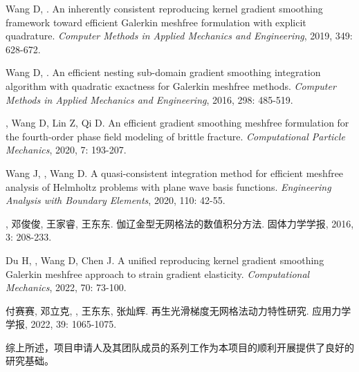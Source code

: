 \vspace{-50pt}
\begin{thebibliography}{1}
	Wang D, .
	\newblock An inherently consistent reproducing kernel gradient smoothing
	  framework toward efficient {{Galerkin}} meshfree formulation with explicit
	  quadrature.
	\newblock \emph{Computer Methods in Applied Mechanics and Engineering}, 2019,
	  349: 628-672.

	Wang D, .
	\newblock An efficient nesting sub-domain gradient smoothing integration
	  algorithm with quadratic exactness for {{Galerkin}} meshfree methods.
	\newblock \emph{Computer Methods in Applied Mechanics and Engineering}, 2016,
	  298: 485-519.

	, Wang D, Lin Z, Qi D.
	\newblock An efficient gradient smoothing meshfree formulation for the
	  fourth-order phase field modeling of brittle fracture.
	\newblock \emph{Computational Particle Mechanics}, 2020, 7: 193-207.

	Wang J, , Wang D.
	\newblock A quasi-consistent integration method for efficient meshfree analysis
	  of {{Helmholtz}} problems with plane wave basis functions.
	\newblock \emph{Engineering Analysis with Boundary Elements}, 2020, 110: 42-55.

	\textbf{}, 邓俊俊, 王家睿, 王东东.
	\newblock 伽辽金型无网格法的数值积分方法.
	\newblock 固体力学学报, 2016, 3: 208-233.

	Du H, , Wang D, Chen J.
	\newblock A unified reproducing kernel gradient smoothing {{Galerkin}} meshfree
	  approach to strain gradient elasticity.
	\newblock \emph{Computational Mechanics}, 2022, 70: 73-100.

	付赛赛, 邓立克, \textbf{}, 王东东, 张灿辉.
	\newblock 再生光滑梯度无网格法动力特性研究.
	\newblock 应用力学学报, 2022, 39: 1065-1075.

\end{thebibliography}

综上所述，项目申请人及其团队成员的系列工作为本项目的顺利开展提供了良好的研究基础。

\newpage